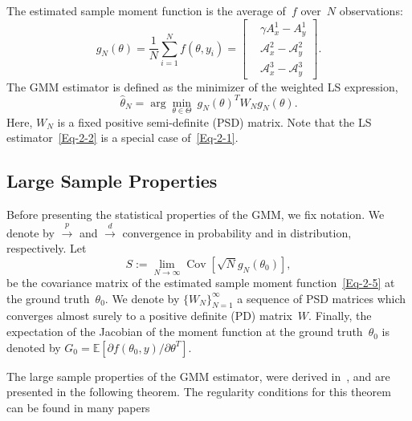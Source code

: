 \documentclass{article}
\newcommand{\A}[0]{\mathcal{A}}
\newcommand{\E}[0]{\mathbb{E}}
\newcommand{\Cov}[0]{\operatorname{Cov}}
\begin{document}
The estimated sample moment function is the average of~$f$ over~$N$ observations:
\begin{equation}\label{Eq-2-5}
	g_N(\theta) = \frac{1}{N} \sum_{i=1}^N f(\theta, y_i) = \begin{bmatrix}
		&\gamma A_x^1 - A_{y}^1\\
		&\A_x^2 - \A_{y}^2 \\
		&\A_x^3 - \A_{y}^3
	\end{bmatrix}.
\end{equation}
The GMM estimator is defined as the minimizer of the weighted LS expression,
\begin{equation} \label{Eq-2-1}
	\hat{\theta}_N = \arg\min_{\theta \in \Theta} \ g_N(\theta)^T W_N g_N(\theta).
\end{equation}
Here, $W_N$ is a fixed positive semi-definite (PSD) matrix. Note that the LS estimator~\eqref{Eq-2-2} is a special case of~\eqref{Eq-2-1}.

\subsection{Large Sample Properties}\label{gmm:large}

Before presenting the statistical properties of the GMM, we fix notation. We denote by $\overset{p}{\to}$ and $\overset{d}{\to}$ convergence in  probability and in distribution, respectively. Let
\begin{equation} \label{eqn:cov_mat_S}
	S := \lim_{N\to \infty}\Cov\left[\sqrt{N}g_N(\theta_0)\right],
\end{equation}
be the covariance matrix of the estimated sample moment function~\eqref{Eq-2-5} at the ground truth~$\theta_0$. We denote by $\{W_N\}_{N=1}^\infty$ a sequence of PSD matrices which converges almost surely to a positive definite (PD) matrix~$W$. Finally, the expectation of the Jacobian of the moment function at the ground truth~$\theta_0$ is denoted by $G_0 = \E\left[\partial f(\theta_0, y) / \partial \theta^T\right]$.


The large sample properties of the GMM estimator, were derived in~\cite{Hansen1982}, and are presented in the following theorem. The regularity conditions for this theorem can be found in many papers~\cite{Hansen1982, Hall2005, abas2021generalized}
\end{document}
